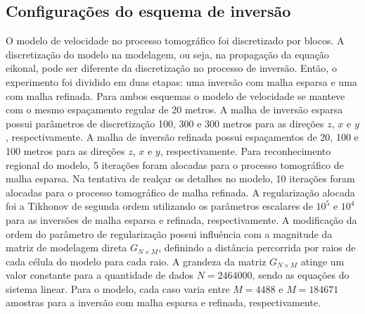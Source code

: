 \subsection{Configurações do esquema de inversão}

O modelo de velocidade no processo tomográfico foi discretizado por blocos. A discretização do modelo na modelagem, ou seja, na propagação da equação eikonal, pode ser diferente da discretização no processo de inversão. Então, o experimento foi dividido em duas etapas: uma inversão com malha esparsa e uma com malha refinada. Para ambos esquemas o modelo de velocidade se manteve com o mesmo espaçamento regular de 20 metros. A malha de inversão esparsa possui parâmetros de discretização 100, 300 e 300 metros para as direções $z$, $x$ e $y$, respectivamente. A malha de inversão refinada possui espaçamentos de 20, 100 e 100 metros para as direções $z$, $x$ e $y$, respectivamente. Para reconhecimento regional do modelo, 5 iterações foram alocadas para o processo tomográfico de malha esparsa. Na tentativa de realçar os detalhes no modelo, 10 iterações foram alocadas para o processo tomográfico de malha refinada. A regularização alocada foi a Tikhonov de segunda ordem utilizando os parâmetros escalares de $10^5$ e $10^4$ para as inversões de malha esparsa e refinada, respectivamente. A modificação da ordem do parâmetro de regularização possui influência com a magnitude da matriz de modelagem direta $G_{N\times M}$, definindo a distância percorrida por raios de cada célula do modelo para cada raio. A grandeza da matriz $G_{N\times M}$ atinge um valor constante para a quantidade de dados $N = 2464000$, sendo as equações do sistema linear. Para o modelo, cada caso varia entre $M = 4488$ e $M = 184671$ amostras para a inversão com malha esparsa e refinada, respectivamente.   







